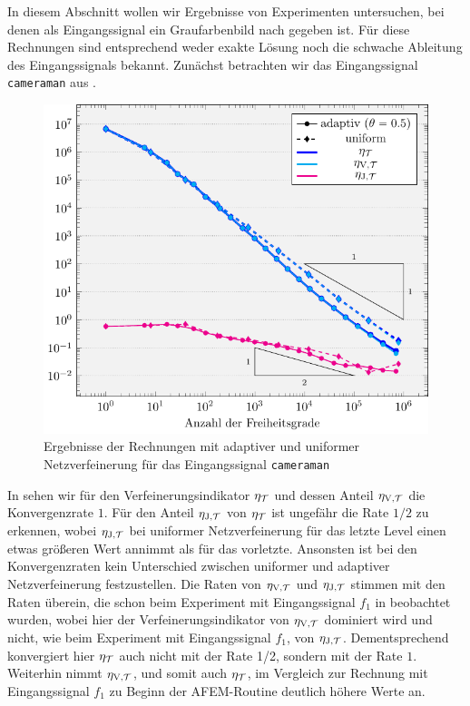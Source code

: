 In diesem Abschnitt wollen wir Ergebnisse von Experimenten untersuchen, bei
denen als Eingangssignal ein
Graufarbenbild nach  gegeben ist.
Für diese Rechnungen sind entsprechend weder exakte Lösung noch die schwache
Ableitung des Eingangssignals bekannt.
Zunächst betrachten wir das Eingangssignal \texttt{cameraman} aus
. 
\begin{figure}[p]
  \centering
  \includegraphics[width=.8\linewidth]
    {pictures/chapExperiments/secGrayscale/cam/conv.pdf}
  \caption{Ergebnisse der Rechnungen mit adaptiver und uniformer 
    Netzverfeinerung für das Eingangssignal \texttt{cameraman}}
  \label{fig:camConvergence}
\end{figure}
In  sehen wir für den Verfeinerungsindikator $\eta_{\mathcal{T}}$
und dessen Anteil $\eta_{\textup{V}, \mathcal{T}}$ die Konvergenzrate $1$.
Für den Anteil $\eta_{\textup{J}, \mathcal{T}}$ von $\eta_{\mathcal{T}}$ ist ungefähr die Rate $1/2$ zu erkennen, 
wobei $\eta_{\textup{J}, \mathcal{T}}$ bei uniformer Netzverfeinerung für das letzte Level einen
etwas größeren Wert annimmt als für das vorletzte.
Ansonsten ist bei den Konvergenzraten kein Unterschied zwischen uniformer und
adaptiver Netzverfeinerung festzustellen.
Die Raten von $\eta_{\textup{V}, \mathcal{T}}$ und $\eta_{\textup{J}, \mathcal{T}}$ stimmen mit den Raten überein, die schon beim
Experiment mit Eingangssignal $f_1$ in  beobachtet
wurden, wobei hier der Verfeinerungsindikator von $\eta_{\textup{V}, \mathcal{T}}$ dominiert wird und
nicht, wie beim Experiment mit Eingangssignal $f_1$, von $\eta_{\textup{J}, \mathcal{T}}$.
Dementsprechend konvergiert hier $\eta_{\mathcal{T}}$ auch nicht mit der Rate 1/2, sondern
mit der Rate $1$.
Weiterhin nimmt $\eta_{\textup{V}, \mathcal{T}}$, und somit auch $\eta_{\mathcal{T}}$, im Vergleich zur Rechnung mit
Eingangssignal $f_1$ zu Beginn der AFEM-Routine deutlich höhere Werte an.
